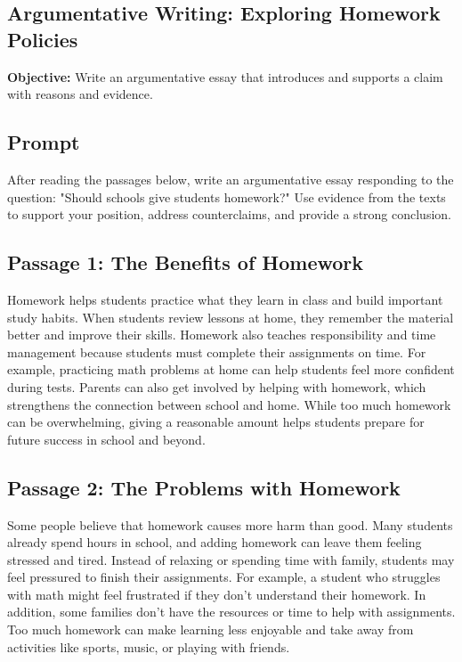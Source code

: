 \documentclass[12pt]{article}
\begin{document}
\subsection*{Argumentative Writing: Exploring Homework Policies}
\onehalfspacing

\begin{tcolorbox}[colframe=black!40, colback=gray!0, title=Learning Objective]
\textbf{Objective:} Write an argumentative essay that introduces and supports a claim with reasons and evidence.
\end{tcolorbox}

\subsection*{Prompt}

After reading the passages below, write an argumentative essay responding to the question:  
"Should schools give students homework?"  
Use evidence from the texts to support your position, address counterclaims, and provide a strong conclusion.

\subsection*{Passage 1: The Benefits of Homework}

Homework helps students practice what they learn in class and build important study habits. When students review lessons at home, they remember the material better and improve their skills. Homework also teaches responsibility and time \\management because students must complete their assignments on time. For example, practicing math problems at home can help students feel more confident during tests. Parents can also get involved by helping with homework, which strengthens the connection between school and home. While too much homework can be overwhelming, giving a reasonable amount helps students prepare for future success in school and beyond.

\subsection*{Passage 2: The Problems with Homework}

Some people believe that homework causes more harm than good. Many students already spend hours in school, and adding homework can leave them feeling stressed and tired. Instead of relaxing or spending time with family, students may feel pressured to finish their assignments. For example, a student who struggles with math might feel frustrated if they don’t understand their homework. In addition, some families don’t have the resources or time to help with assignments. Too much homework can make learning less enjoyable and take away from activities like sports, music, or playing with friends.
\newpage
\end{document}
